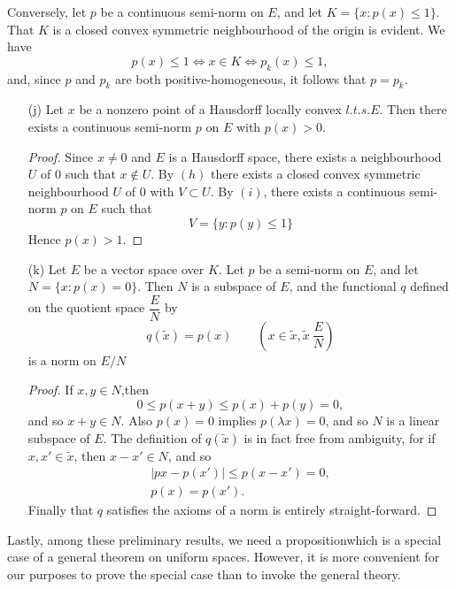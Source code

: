 Conversely, let $p$ be a continuous semi-norm on $E$, and let $K= \{x
: p(x) \leq 1\}$. That $K$ is a closed convex symmetric neighbourhood
of the origin is evident. We have 
$$
p(x) \leq 1 \Leftrightarrow x \in K \Leftrightarrow p_k (x) \leq 1,
$$
and, since $p$ and $p_k$ are both positive-homogeneous, it follows
that $p=p_k$.  
\begin{enumerate}[i)]
\item[(j)]  Let $x$ be a nonzero point of a Hausdorff locally convex
  $l.t.s.E$. Then there exists a continuous semi-norm $p$ on $E$ with
  $p(x)>0$.

  \begin{proof}
    Since $x \neq 0$  and $E$ is a Hausdorff space, there exists a
    neighbourhood $U$ of 0 such that $x \notin U$. By $(h)$ there
    exists a closed convex symmetric neighbourhood $U$ of 0 with $V
    \subset U$. By $(i)$, there exists a continuous semi-norm $p$ on $E$
    such that 
    $$
    V=\{ y: p(y) \leq 1 \}
    $$
    Hence $p(x) > 1$.
  \end{proof}
  
\item[(k)] Let $E$ be a vector space over $K$. Let $p$ be a semi-norm on $E$,
  and let $N=\{x : p(x)= 0\}$. Then $N$ is a subspace of $E$, and the
  functional $q$ defined on the quotient space $\dfrac{E}{N}$ by 
  $$
  q(\tilde{x})= p(x) \qquad (x \in \tilde{x}, \tilde{x} ~ \frac{E}{N}) 
  $$
  is a norm on $E/N$
  
  \begin{proof}
    If $x,y \in N$,\pageoriginale then 
    $$
 0\leq p(x+y) \leq p(x)+ p(y)=0,
    $$
    and so $x+y \in N$. Also $p(x)=0$ implies $p(\lambda x)=0$, and so
    $N$ is a linear subspace of $E$. The definition of $q(\tilde{x})$ is
    in fact free from ambiguity, for if $x, x' \in \tilde{x}$, then
    $x-x' \in N$, and so  
    \begin{gather*}
      |p{x}-p(x')| \leq p(x-x') =0,\\
      p(x)=p(x').
    \end{gather*}
  Finally that $q$ satisfies the axioms of a norm is entirely
  straight-forward. 
  \end{proof}
\end{enumerate} %

Lastly, among these preliminary results, we need a proposition\break which
is a special case of a general theorem on uniform spaces. However, it
is more convenient for our purposes to prove the special case than to
invoke the general theory. 

